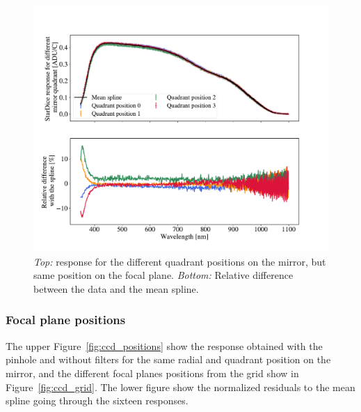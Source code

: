 \begin{figure}[h]
    \centering
    \includegraphics[width=\columnwidth]{fig/quadrant_positions.pdf}
    \caption{\textit{Top:} \SD response for the different quadrant positions on the mirror, but same position on the focal plane. \textit{Bottom:} Relative difference between the data and the mean spline.}
    \label{fig:quadrant_positions}
\end{figure}

\subsubsection{Focal plane positions}

The upper Figure~\ref{fig:ccd_positions} show the \SD response obtained with the \spinhole pinhole and without filters for the same radial and quadrant position on the mirror, and the different focal planes positions from the grid show in Figure~\ref{fig:ccd_grid}. The lower figure show the normalized residuals to the mean spline going through the sixteen responses.

